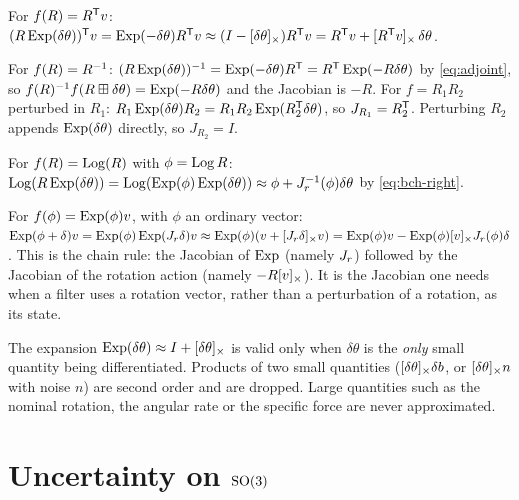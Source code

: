 \begin{example}
For $f(R) = R^{\mathsf{T}} v$: $(R\operatorname{Exp}(\delta\theta))^{\mathsf{T}} v = \operatorname{Exp}(-\delta\theta)R^{\mathsf{T}} v \approx (I - [\delta\theta]_{\times})R^{\mathsf{T}} v =
R^{\mathsf{T}} v + [R^{\mathsf{T}} v]_{\times}\,\delta\theta$.
\end{example}

\begin{example}
For $f(R) = R^{-1}$: $(R\operatorname{Exp}(\delta\theta))^{-1} = \operatorname{Exp}(-\delta\theta)R^{\mathsf{T}} = R^{\mathsf{T}}\operatorname{Exp}(-R\delta\theta)$ by
\eqref{eq:adjoint}, so $f(R)^{-1} f(R\boxplus\delta\theta) = \operatorname{Exp}(-R\delta\theta)$ and the Jacobian is $-R$. For
$f = R_1R_2$ perturbed in $R_1$: $R_1\operatorname{Exp}(\delta\theta)R_2 = R_1R_2\operatorname{Exp}(R_2^{\mathsf{T}}\delta\theta)$, so $J_{R_1} = R_2^{\mathsf{T}}$.
Perturbing $R_2$ appends $\operatorname{Exp}(\delta\theta)$ directly, so $J_{R_2} = I$.
\end{example}

\begin{example}[Logarithm]
For $f(R) = \operatorname{Log}(R)$ with $\phi = \operatorname{Log} R$: $\operatorname{Log}(R\operatorname{Exp}(\delta\theta)) = \operatorname{Log}(\operatorname{Exp}(\phi)\operatorname{Exp}(\delta\theta)) \approx
\phi + J_r^{-1}(\phi)\delta\theta$ by \eqref{eq:bch-right}.
\end{example}

\begin{example}
For $f(\phi) = \operatorname{Exp}(\phi)v$, with $\phi$ an ordinary vector: $\operatorname{Exp}(\phi + \delta)v = \operatorname{Exp}(\phi)\operatorname{Exp}(J_r\delta)v \approx \operatorname{Exp}(\phi)(v + [J_r\delta]_{\times}v)
= \operatorname{Exp}(\phi)v - \operatorname{Exp}(\phi)[v]_{\times}J_r(\phi)\delta$. This is the chain rule: the Jacobian of $\operatorname{Exp}$ (namely $J_r$) followed by the Jacobian of the rotation action
(namely $-R[v]_{\times}$). It is the Jacobian one needs when a filter uses a rotation vector, rather than a perturbation of a rotation, as its state.
\end{example}

\begin{pitfall}
The expansion $\operatorname{Exp}(\delta\theta) \approx I + [\delta\theta]_{\times}$ is valid only when $\delta\theta$ is the
\emph{only} small quantity being differentiated. Products of two small quantities ($[\delta\theta]_{\times}\delta b$,
or $[\delta\theta]_{\times}n$ with noise $n$) are second order and are dropped. Large quantities such as the
nominal rotation, the angular rate or the specific force are never approximated.
\end{pitfall}

\section{Uncertainty on \texorpdfstring{$\mathrm{SO}(3)$}{SO(3)}}

